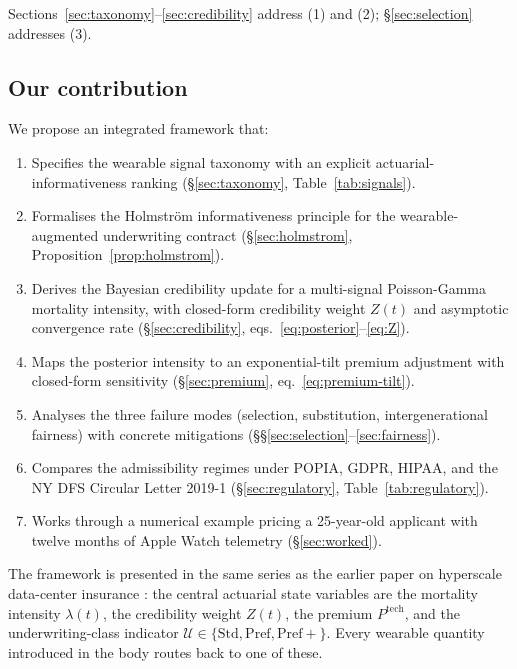 \documentclass[11pt,a4paper]{article}
\theoremstyle{ia}
\newcommand{\1}{\mathbf{1}}
\begin{document}
Sections~\ref{sec:taxonomy}--\ref{sec:credibility} address (1) and (2);
\S\ref{sec:selection} addresses (3).

\subsection{Our contribution}\label{ss:contrib}

We propose an integrated framework that:

\begin{enumerate}[leftmargin=*,nosep,topsep=4pt]
   \item Specifies the wearable signal taxonomy with an explicit
         actuarial-informativeness ranking
         (\S\ref{sec:taxonomy}, Table~\ref{tab:signals}).
   \item Formalises the Holmstr\"om informativeness principle for the
         wearable-augmented underwriting contract
         (\S\ref{sec:holmstrom}, Proposition~\ref{prop:holmstrom}).
   \item Derives the Bayesian credibility update for a multi-signal
         Poisson-Gamma mortality intensity, with closed-form
         credibility weight $Z(t)$ and asymptotic convergence rate
         (\S\ref{sec:credibility}, eqs.~\eqref{eq:posterior}--\eqref{eq:Z}).
   \item Maps the posterior intensity to an exponential-tilt premium
         adjustment with closed-form sensitivity
         (\S\ref{sec:premium}, eq.~\eqref{eq:premium-tilt}).
   \item Analyses the three failure modes (selection,
         substitution, intergenerational fairness) with concrete
         mitigations (\S\S\ref{sec:selection}--\ref{sec:fairness}).
   \item Compares the admissibility regimes under POPIA, GDPR, HIPAA,
         and the NY DFS Circular Letter 2019-1
         (\S\ref{sec:regulatory}, Table~\ref{tab:regulatory}).
   \item Works through a numerical example pricing a 25-year-old
         applicant with twelve months of Apple Watch telemetry
         (\S\ref{sec:worked}).
\end{enumerate}

The framework is presented in the same series as the earlier paper on
hyperscale data-center insurance \citep{Denewade2026DC}: the central
actuarial state variables are the mortality intensity $\lambda(t)$,
the credibility weight $Z(t)$, the premium $P^{\mathrm{tech}}$, and
the underwriting-class indicator $\mathcal{U}\in\{\mathrm{Std},
\mathrm{Pref},\mathrm{Pref+}\}$. Every wearable quantity introduced
in the body routes back to one of these.
\end{document}
